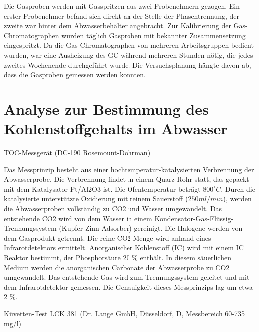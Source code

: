 Die Gasproben werden mit Gasspritzen aus zwei Probenehmern  gezogen.  Ein erster Probenehmer befand sich direkt an der Stelle der Phasentrennung, der zweite war hinter dem Abwasserbehälter angebracht. 
Zur Kalibrierung der Gas-Chromatographen wurden täglich Gasproben mit bekannter Zusammensetzung eingespritzt. Da die Gas-Chromatographen von mehreren Arbeitsgruppen bedient wurden, war eine Ausheizung des GC während mehreren Stunden nötig, die jedes zweites Wochenende durchgeführt wurde.  Die Versuchsplanung hängte davon ab, dass die Gasproben gemessen werden konnten.

\section{Analyse zur Bestimmung des Kohlenstoffgehalts im Abwasser}

TOC-Messgerät (DC-190 Rosemount-Dohrman) 

Das Messprinzip besteht aus einer hochtemperatur-katalysierten Verbrennung der Abwasserprobe. Die Verbrennung findet in einem Quarz-Rohr statt, das  gepackt mit dem Katalysator Pt/Al2O3 ist. Die Ofentemperatur  beträgt $800 ^{\circ}C$. Durch die katalysierte unterstützte Oxidierung mit reinem Sauerstoff ($250 ml/min$), werden die Abwasserproben vollständig zu CO2 und Wasser umgewandelt. Das entstehende CO2 wird von dem Wasser in einem Kondensator-Gas-Flüssig-Trennungssystem (Kupfer-Zinn-Adsorber) gereinigt. Die Halogene werden von dem Gasprodukt getrennt. Die reine CO2-Menge wird anhand eines Infrarotdetektors ermittelt. Anorganischer Kohlenstoff (IC) wird mit einem IC  Reaktor bestimmt, der Phosphorsäure 20 \% enthält. In diesem säuerlichen Medium werden die  anorganischen Carbonate der Abwasserprobe zu CO2 umgewandelt. Das entstehende Gas wird zum Trennungssystem geleitet und mit dem Infrarotdetektor gemessen. Die Genauigkeit dieses Messprinzips lag um etwa 2 \%. 

Küvetten-Test LCK 381 (Dr. Lange GmbH, Düsseldorf, D, Messbereich 60-735 mg/l)

